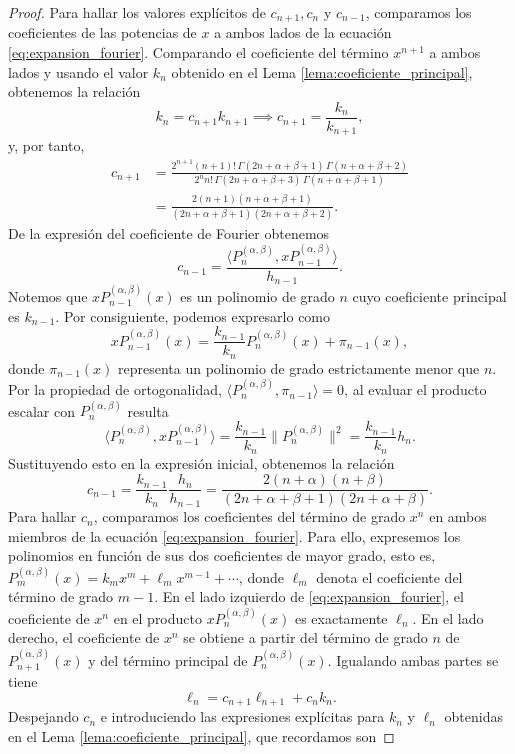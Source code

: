 \documentclass[12pt,a4paper]{book}
\begin{document}
\begin{proof}
Para hallar los valores explícitos de $c_{n+1}, c_n$ y $c_{n-1}$, comparamos los coeficientes de las potencias de $x$ a ambos lados de la ecuación \eqref{eq:expansion_fourier}.
Comparando el coeficiente del término $x^{n+1}$ a ambos lados y usando el valor $k_n$ obtenido en el Lema \ref{lema:coeficiente_principal}, obtenemos la relación
\[
k_n = c_{n+1} k_{n+1} \implies c_{n+1} = \frac{k_n}{k_{n+1}},
\]
y, por tanto,
\begin{align*}
    c_{n+1} &= \frac{2^{n+1}(n+1)! \, \Gamma(2n+\alpha+\beta+1) \, \Gamma(n+\alpha+\beta+2)}{2^n n! \, \Gamma(2n+\alpha+\beta+3) \, \Gamma(n+\alpha+\beta+1)} \\ &=  \frac{2(n+1)(n+\alpha+\beta+1)}{(2n+\alpha+\beta+1)(2n+\alpha+\beta+2)}.
\end{align*}
De la expresión del coeficiente de Fourier obtenemos
\[
c_{n-1} = \frac{\langle P_n^{(\alpha, \beta)}, x P_{n-1}^{(\alpha, \beta)} \rangle}{h_{n-1}}.
\]
Notemos que $x P_{n-1}^{(\alpha, \beta)}(x)$ es un polinomio de grado $n$ cuyo coeficiente principal es $k_{n-1}$. Por consiguiente, podemos expresarlo como
\[
x P_{n-1}^{(\alpha, \beta)}(x) = \frac{k_{n-1}}{k_n} P_n^{(\alpha, \beta)}(x) + \pi_{n-1}(x),
\]
donde $\pi_{n-1}(x)$ representa un polinomio de grado estrictamente menor que $n$. Por la propiedad de ortogonalidad, $\langle P_n^{(\alpha, \beta)}, \pi_{n-1} \rangle = 0$, al evaluar el producto escalar con $P_n^{(\alpha, \beta)}$ resulta
\[
\langle P_n^{(\alpha, \beta)}, x P_{n-1}^{(\alpha, \beta)} \rangle = \frac{k_{n-1}}{k_n} \| P_n^{(\alpha, \beta)} \|^2 = \frac{k_{n-1}}{k_n} h_n.
\]
Sustituyendo esto en la expresión inicial, obtenemos la relación
\[
c_{n-1} = \frac{k_{n-1}}{k_n} \frac{h_n}{h_{n-1}} = \frac{2(n+\alpha)(n+\beta)}{(2n+\alpha+\beta+1)(2n+\alpha+\beta)}.
\]
Para hallar $c_n$, comparamos los coeficientes del término de grado $x^n$ en ambos miembros de la ecuación \eqref{eq:expansion_fourier}. Para ello, expresemos los polinomios en función de sus dos coeficientes de mayor grado, esto es, $P_m^{(\alpha, \beta)}(x) = k_m x^m + \ell_m x^{m-1} + \cdots$, donde $\ell_m$ denota el coeficiente del término de grado $m-1$. 
En el lado izquierdo de \eqref{eq:expansion_fourier}, el coeficiente de $x^n$ en el producto $x P_n^{(\alpha, \beta)}(x)$ es exactamente $\ell_n$. En el lado derecho, el coeficiente de $x^n$ se obtiene a partir del término de grado $n$ de $P_{n+1}^{(\alpha, \beta)}(x)$ y del término principal de $P_n^{(\alpha, \beta)}(x)$. Igualando ambas partes se tiene
\[
\ell_n = c_{n+1} \ell_{n+1} + c_n k_n.
\]
Despejando $c_n$ e introduciendo las expresiones explícitas para $k_n$ y $\ell_n$ obtenidas en el Lema \ref{lema:coeficiente_principal}, que recordamos son

\end{proof}
\end{document}
